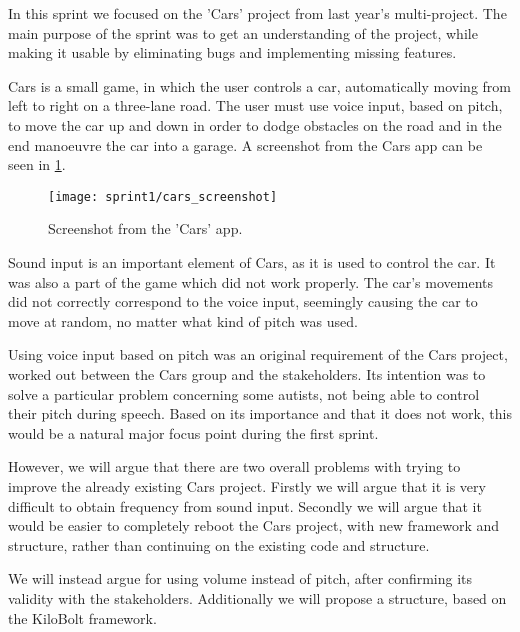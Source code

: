 In this sprint we focused on the 'Cars' project from last year's multi-project.
The main purpose of the sprint was to get an understanding of the project, while making it usable by eliminating bugs and implementing missing features.

Cars is a small game, in which the user controls a car, automatically moving from left to right on a three-lane road.
The user must use voice input, based on pitch, to move the car up and down in order to dodge obstacles on the road and in the end manoeuvre the car into a garage.
A screenshot from the Cars app can be seen in \cref{fig:cars_screenshot}.

\begin{figure}[h]
\centering
\texttt{[image: sprint1/cars\_screenshot]}
\caption{Screenshot from the 'Cars' app.}
\label{fig:cars_screenshot}
\end{figure}

Sound input is an important element of Cars, as it is used to control the car.
It was also a part of the game which did not work properly.
The car's movements did not correctly correspond to the voice input, seemingly causing the car to move at random, no matter what kind of pitch was used.

Using voice input based on pitch was an original requirement of the Cars project, worked out between the Cars group and the stakeholders.
Its intention was to solve a particular problem concerning some autists, not being able to control their pitch during speech.
Based on its importance and that it does not work, this would be a natural major focus point during the first sprint.

However, we will argue that there are two overall problems with trying to improve the already existing Cars project.
Firstly we will argue that it is very difficult to obtain frequency from sound input.
Secondly we will argue that it would be easier to completely reboot the Cars project, with new framework and structure, rather than continuing on the existing code and structure.

We will instead argue for using volume instead of pitch, after confirming its validity with the stakeholders.
Additionally we will propose a structure, based on the KiloBolt framework.